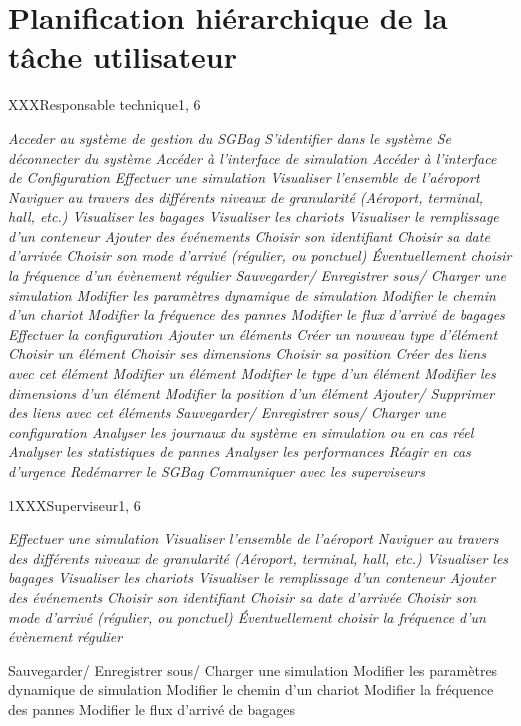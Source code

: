 \newpage
\part{Planification hiérarchique de la tâche utilisateur}

\phtu
{XXX}{Responsable technique}{1, 6}
{
\begin{tabular}
	\it{} Acceder au système de gestion du SGBag
		\sit{} S'identifier dans le système
		\sit{} Se déconnecter du système
		\sit{} Accéder à l'interface de simulation
		\sit{} Accéder à l'interface de Configuration
	\it{} Effectuer une simulation
		\sit{} Visualiser l'ensemble de l'aéroport
			\ssit{} Naviguer au travers des différents niveaux de granularité (Aéroport, terminal, hall, \textsl{etc.})
			\ssit{} Visualiser les bagages
			\ssit{} Visualiser les chariots
			\ssit{} Visualiser le remplissage d'un conteneur
		\sit{} Ajouter des événements
			\ssit{} Choisir son identifiant
			\ssit{} Choisir sa date d'arrivée
			\ssit{} Choisir son mode d'arrivé (régulier, ou ponctuel)
			\ssit{} Éventuellement choisir la fréquence d'un évènement régulier
		\sit{} Sauvegarder/ Enregistrer sous/ Charger une simulation
		\sit{} Modifier les paramètres dynamique de simulation
			\ssit{} Modifier le chemin d'un chariot	
			\ssit{} Modifier la fréquence des pannes
			\ssit{} Modifier le flux d'arrivé de bagages
	\it{} Effectuer la configuration
		\sit{} Ajouter un éléments 
			\ssit{} Créer un nouveau type d'élément
			\ssit{} Choisir un élément
			\ssit{} Choisir ses dimensions
			\ssit{} Choisir sa position
			\ssit{} Créer des liens avec cet élément
		\sit{} Modifier un élément
			\ssit{} Modifier le type d'un élément
			\ssit{} Modifier les dimensions d'un élément
			\ssit{} Modifier la position d'un élément
			\ssit{} Ajouter/ Supprimer des liens avec cet éléments
		\sit{} Sauvegarder/ Enregistrer sous/ Charger une configuration
	\it{} Analyser les journaux du système en simulation ou en cas réel
		\sit{} Analyser les statistiques de pannes
		\sit{} Analyser les performances
	\it{} Réagir en cas d'urgence 
		\sit{} Redémarrer le SGBag
		\sit{} Communiquer avec les superviseurs
\end{tabular}
}

\phtu
{1}{XXX}{Superviseur}{1, 6}
{
	\it{} Effectuer une simulation
		\sit{} Visualiser l'ensemble de l'aéroport
			\ssit{} Naviguer au travers des différents niveaux de granularité (Aéroport, terminal, hall, \textsl{etc.})
			\ssit{} Visualiser les bagages
			\ssit{} Visualiser les chariots
			\ssit{} Visualiser le remplissage d'un conteneur
		\sit{} Ajouter des événements
			\ssit{} Choisir son identifiant
			\ssit{} Choisir sa date d'arrivée
			\ssit{} Choisir son mode d'arrivé (régulier, ou ponctuel)
			\ssit{} Éventuellement choisir la fréquence d'un évènement régulier

		\sit{} Sauvegarder/ Enregistrer sous/ Charger une simulation
		\sit{} Modifier les paramètres dynamique de simulation
			\ssit{} Modifier le chemin d'un chariot	
			\ssit{} Modifier la fréquence des pannes
			\ssit{} Modifier le flux d'arrivé de bagages
}
